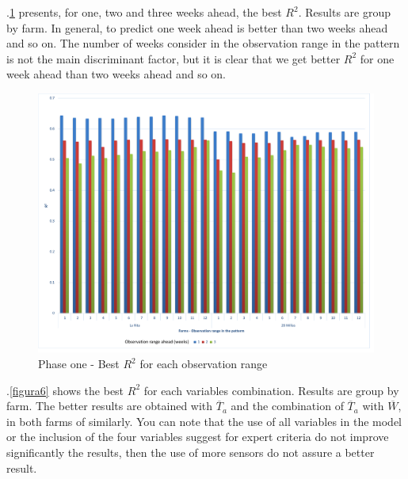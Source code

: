\documentclass[review,authoryear,english]{elsarticle}
\begin{document}
\figurename $.$\ref{figura5} presents, for one, two and three weeks ahead, the best $R^2$. Results are group by farm. In general, to predict one week ahead is better than two weeks ahead and so on. The number of weeks consider in the observation range in the pattern is not the main discriminant factor, but it is clear that we get better $R^2$ for one week ahead than two weeks ahead and so on.

\begin{figure}[H] 
 \centering
 \includegraphics[scale=.5]{Phase_one_Best_R2_for_each_number_of_observation_range_in_the_patterm}
 \caption{Phase one - Best $R^2$ for each observation range} 
 \label{figura5} 
\end{figure}

\figurename $.$\ref{figura6} shows the best $R^2$ for each variables combination. Results are group by farm. The better results are obtained with $\overline{T}_{a}$ and the combination of $\overline{T}_{a}$ with $\overline{W}$, in both farms of similarly. You can note that the use of all variables in the model or the inclusion of the four variables suggest for expert criteria do not improve significantly the results, then the use of more sensors do not assure a better result. 
\end{document}
